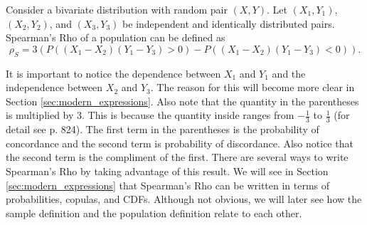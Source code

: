 \begin{definition}\label{def:spearman_population}
    Consider a bivariate distribution with random pair $(X,Y)$. Let $(X_1,Y_1)$, $(X_2,Y_2)$, and $(X_3,Y_3)$ be independent and identically distributed pairs. Spearman's Rho of a population can be defined as $$\rho_S=3\left(P\left(\left(X_1-X_2\right)\left(Y_1-Y_3\right)>0\right)-P\left(\left(X_1-X_2\right)\left(Y_1-Y_3\right)<0\right)\right).$$
\end{definition}
It is important to notice the dependence between $X_1$  and $Y_1$ and the independence between $X_2$ and $Y_3$. The reason for this will become more clear in Section \ref{sec:modern_expressions}. Also note that the quantity in the parentheses is multiplied by 3. This is because the quantity inside ranges from $-\frac{1}{3}$ to $\frac{1}{3}$ (for detail see \cite{kruskal1958} p. 824). The first term in the parentheses is the probability of concordance and the second term is probability of discordance. Also notice that the second term is the compliment of the first. There are several ways to write Spearman's Rho by taking advantage of this result. We will see in Section \ref{sec:modern_expressions} that Spearman's Rho can be written in terms of probabilities, copulas, and CDFs. Although not obvious, we will later see how the sample definition and the population definition relate to each other.
